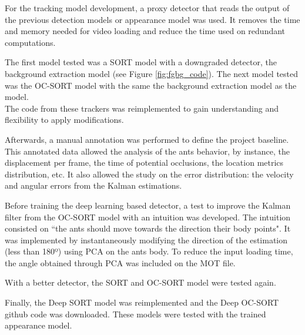 

{
    For the tracking model development, a proxy detector that reads the output of the previous detection models or appearance model was used. It removes the time and memory needed for video loading and reduce the time used on redundant computations.
}

{
    The first model tested was a SORT model with a downgraded detector, the background extraction model (see Figure \ref{fig:fgbg_code}). 
    The next model tested was the OC-SORT model with the same the background extraction model as the model.\\
    The code from these trackers was reimplemented to gain understanding and flexibility to apply modifications.
}

{
    Afterwards, a manual annotation was performed to define the project baseline. 
    This annotated data allowed the analysis of the ants behavior, by instance, the displacement per frame, the time of potential occlusions, the location metrics distribution, etc. 
    It also allowed the study on the error distribution: the velocity and angular errors from the Kalman estimations.
}

{
    Before training the deep learning based detector, a test to improve the Kalman filter from the OC-SORT model with an intuition was developed. 
    The intuition consisted on ``the ants should move towards the direction their body points". 
    It was implemented by instantaneously modifying the direction of the estimation (less than 180º) using \ac{PCA} on the ants body. 
    To reduce the input loading time, the angle obtained through \ac{PCA} was included on the MOT file.
}

{
    With a better detector, the SORT and OC-SORT model were tested again.
}

{
    Finally, the Deep SORT model was reimplemented and the Deep OC-SORT github code was downloaded. These models were tested with the trained appearance model.
}
